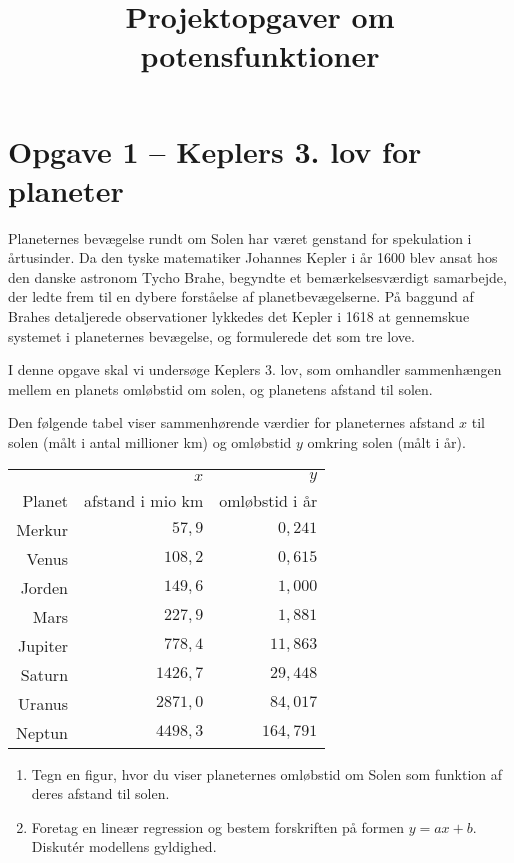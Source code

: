 \documentclass[12pt,oneside,a4paper]{article}
\title{Projektopgaver om potensfunktioner}
\date{\vspace{-5ex}}
\theoremstyle{plain}
\begin{document}
\maketitle

\section*{Opgave 1 -- Keplers 3. lov for planeter}
Planeternes bevægelse rundt om Solen har været genstand for spekulation i
årtusinder.  Da den tyske matematiker Johannes Kepler i år 1600 blev ansat hos
den danske astronom Tycho Brahe, begyndte et bemærkelsesværdigt samarbejde,
der ledte frem til en dybere forståelse af planetbevægelserne. På baggund af
Brahes detaljerede observationer lykkedes det Kepler i 1618 at gennemskue
systemet i planeternes bevægelse, og formulerede det som tre love.

I denne opgave skal vi undersøge Keplers 3. lov, som omhandler sammenhængen
mellem en planets omløbstid om solen, og planetens afstand til solen.

Den følgende tabel viser sammenhørende værdier for planeternes afstand $x$ til
solen (målt i antal millioner km) og omløbstid $y$ omkring solen (målt i år).

\vspace{2ex}

\begin{center}
\begin{tabular}{|r|r|r|}
    \hline
            & $x$                 & $y$ \\
    Planet  & afstand i mio km    & omløbstid i år   \\
    \hline 
    Merkur  &  $  57,9$ &   $0,241$ \\
    Venus   &  $ 108,2$ &   $0,615$ \\
    Jorden  &  $ 149,6$ &   $1,000$ \\
    Mars    &  $ 227,9$ &   $1,881$ \\
    Jupiter &  $ 778,4$ &  $11,863$ \\
    Saturn  &  $1426,7$ &  $29,448$ \\
    Uranus  &  $2871,0$ &  $84,017$ \\
    Neptun  &  $4498,3$ & $164,791$ \\
    \hline 
\end{tabular}
\end{center}

\begin{enumerate}[label=(\alph*)]
    \item Tegn en figur, hvor du viser planeternes omløbstid om Solen som
        funktion af deres afstand til solen.
    \item Foretag en lineær regression og bestem forskriften på formen
        $y=ax+b$. Diskutér modellens gyldighed.
\end{enumerate}
\end{document}
